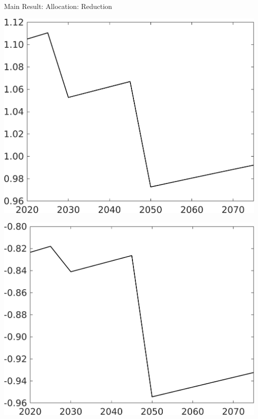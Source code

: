 \documentclass[11pt,aspectratio=169]{beamer}
\begin{document}
\begin{frame}{Main Result: Allocation: Reduction}
\begin{minipage}[]{0.32\textwidth}
\end{minipage}
\begin{minipage}[]{0.32\textwidth}
	\includegraphics[width=1\textwidth]{../codding_model/own_basedOnFried/optimalPol_elastS_DisuSci/figures/all_1705/Single_OPT_T_NoTaus_Y_spillover0_sep1_BN0_ineq0_red0_etaa0.79.png}
\end{minipage}
\begin{minipage}[]{0.32\textwidth}
	\includegraphics[width=1\textwidth]{../codding_model/own_basedOnFried/optimalPol_elastS_DisuSci/figures/all_1705/Single_OPT_T_NoTaus_SWF_spillover0_sep1_BN0_ineq0_red0_etaa0.79.png}

\end{minipage}
\end{frame}
\end{document}
